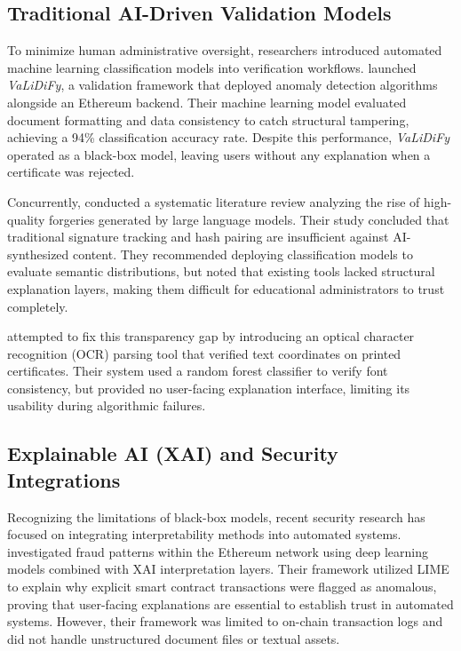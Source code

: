 \subsection{Traditional AI-Driven Validation Models}
To minimize human administrative oversight, researchers introduced automated machine learning classification models into verification workflows. \cite{rai2024validify} launched \textit{VaLiDiFy}, a validation framework that deployed anomaly detection algorithms alongside an Ethereum backend. Their machine learning model evaluated document formatting and data consistency to catch structural tampering, achieving a 94\% classification accuracy rate. Despite this performance, \textit{VaLiDiFy} operated as a black-box model, leaving users without any explanation when a certificate was rejected.

Concurrently,\cite{wiputra2024harnessing} conducted a systematic literature review analyzing the rise of high-quality forgeries generated by large language models. Their study concluded that traditional signature tracking and hash pairing are insufficient against AI-synthesized content. They recommended deploying classification models to evaluate semantic distributions, but noted that existing tools lacked structural explanation layers, making them difficult for educational administrators to trust completely.

 \cite{karam2024automated} attempted to fix this transparency gap by introducing an optical character recognition (OCR) parsing tool that verified text coordinates on printed certificates. Their system used a random forest classifier to verify font consistency, but provided no user-facing explanation interface, limiting its usability during algorithmic failures.

\subsection{Explainable AI (XAI) and Security Integrations}
Recognizing the limitations of black-box models, recent security research has focused on integrating interpretability methods into automated systems. \cite{taher2024advanced} investigated fraud patterns within the Ethereum network using deep learning models combined with XAI interpretation layers. Their framework utilized LIME to explain why explicit smart contract transactions were flagged as anomalous, proving that user-facing explanations are essential to establish trust in automated systems. However, their framework was limited to on-chain transaction logs and did not handle unstructured document files or textual assets.

